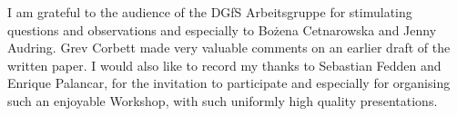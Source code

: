 \documentclass[output=paper,colorlinks,citecolor=brown]{langscibook}
\begin{document}
I am grateful to the audience of the DGfS Arbeitsgruppe for stimulating questions and observations and especially to Bo\.{z}ena Cetnarowska and Jenny Audring. Grev Corbett made very valuable comments on an earlier draft of the written paper. I would also like to record my thanks to Sebastian Fedden and Enrique Palancar, for the invitation to participate and especially for  organising such an enjoyable Workshop, with such uniformly high quality presentations. 



{\sloppy\printbibliography[heading=subbibliography,notkeyword=this]}
\end{document}
